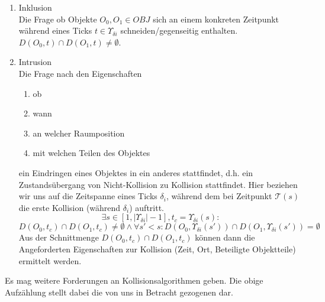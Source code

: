 \begin{enumerate}
	\item Inklusion\\
		Die Frage ob Objekte $O_0, O_1 \in OBJ$ sich an einem konkreten Zeitpunkt während eines Ticks $t\in \Upsilon_{\delta i}$ schneiden/gegenseitig enthalten. $D(O_0, t) \cap D(O_1, t) \neq \emptyset$.
	\item Intrusion\\
		Die Frage nach den Eigenschaften
		\begin{enumerate}
		\item ob
		\item wann
		\item an welcher Raumposition
		\item mit welchen Teilen des Objektes
		\end{enumerate}
		ein Eindringen eines Objektes in ein anderes stattfindet, d.h. ein Zustandsübergang von Nicht-Kollision zu Kollision stattfindet.
		Hier beziehen wir uns auf die Zeitspanne eines Ticks $\delta_i$, während dem bei Zeitpunkt $\mathcal{T}(s)$ die erste Kollision (während $\delta_i$) auftritt. 
		$$\exists s \in [1, |\Upsilon_{\delta i}|-1], t_c= \Upsilon_{\delta i}(s):$$
		$$ D(O_0, t_c)\cap D(O_1, t_c) \neq \emptyset \wedge \forall s' < s: 
		D(O_0, \Upsilon_{\delta i}(s'))\cap D(O_1, \Upsilon_{\delta i}(s')) = \emptyset$$
		Aus der Schnittmenge $D(O_0, t_c)\cap D(O_1, t_c)$ können dann die Angeforderten Eigenschaften zur Kollision (Zeit, Ort, Beteiligte Objektteile) ermittelt werden.
\end{enumerate}
Es mag weitere Forderungen an Kollisionsalgorithmen geben. Die obige Aufzählung stellt dabei die von uns in Betracht gezogenen dar.

